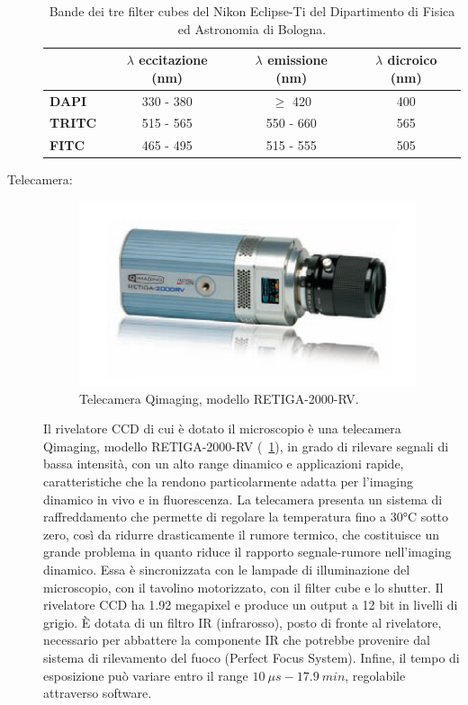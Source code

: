 \begin{description}
\begin{table}[!ht]
 \begin{center}
\begin{small}
\begin{tabular}{lccc}
\hline\hline
&\textbf{$\lambda$ eccitazione (nm)}&\textbf{$\lambda$ emissione (nm)}&\textbf{$\lambda$ dicroico (nm)}\\
\hline
\textbf{DAPI}&330 - 380&$\geq$ 420&400\\
\textbf{TRITC}&515 - 565&550 - 660&565\\
\textbf{FITC}&465 - 495&515 - 555&505\\
\hline\hline
\end{tabular}
\caption{\small{Bande dei tre filter cubes del Nikon Eclipse-Ti del Dipartimento di Fisica ed Astronomia di Bologna.}}
\label{TAB}
\end{small}
\end{center}
\end{table}

\item[Telecamera:]

\begin{figure}
 \centering
 \includegraphics[scale=.60]{img/CAP2CCD.png}
 \caption{\small{Telecamera Qimaging, modello RETIGA-2000-RV.}}
 \label{fig:CCD}
\end{figure}

Il rivelatore CCD di cui è dotato il microscopio è una telecamera Qimaging, modello RETIGA-2000-RV (\figurename~\ref{fig:CCD}), in grado di rilevare segnali di bassa intensità, con un alto range dinamico e applicazioni rapide, caratteristiche che la rendono particolarmente adatta per l'imaging dinamico in vivo e in fluorescenza.
La telecamera presenta un sistema di raffreddamento che permette di regolare la temperatura fino a 30°C sotto zero, così da ridurre drasticamente il rumore termico, che costituisce un grande problema in quanto riduce il rapporto segnale-rumore nell'imaging dinamico.
Essa è sincronizzata con le lampade di illuminazione del microscopio, con il tavolino motorizzato, con il filter cube e lo shutter. 
Il rivelatore CCD ha 1.92 megapixel e produce un output a 12 bit in livelli di grigio.
È dotata di un filtro IR (infrarosso), posto di fronte al rivelatore, necessario per abbattere la componente IR che potrebbe provenire dal sistema di rilevamento del fuoco (Perfect Focus System). 
Infine, il tempo di esposizione può variare entro il range $10\ \mu s - 17.9\ min $, regolabile attraverso software.


\end{description}

